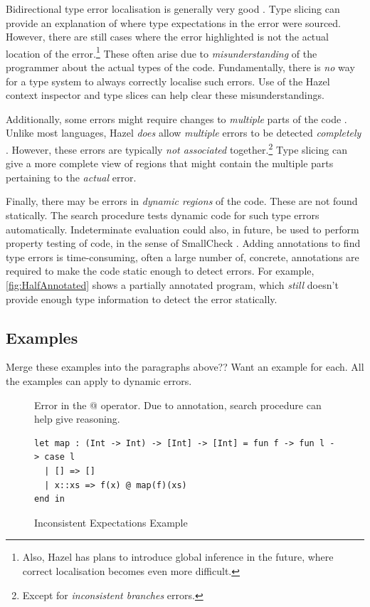 Bidirectional type error localisation is generally very good \cite{BidirectionalTyping}. Type slicing can provide an explanation of where type expectations in the error were sourced. However, there are still cases where the error highlighted is not the actual location of the error.\footnote{Also, Hazel has plans to introduce global inference in the future, where correct localisation becomes even more difficult.} These often arise due to \textit{misunderstanding} of the programmer about the actual types of the code. Fundamentally, there is \textit{no} way for a type system to always correctly localise such errors. Use of the Hazel context inspector and type slices can help clear these misunderstandings.

Additionally, some errors might require changes to \textit{multiple} parts of the code \cite{StudentTypeErrorFixes}. Unlike most languages, Hazel \textit{does} allow \textit{multiple} errors to be detected \textit{completely} \cite{HazelErrors}. However, these errors are typically \textit{not associated} together.\footnote{Except for \textit{inconsistent branches} errors.} Type slicing can give a more complete view of regions that might contain the multiple parts pertaining to the \textit{actual} error.

Finally, there may be errors in \textit{dynamic regions} of the code. These are not found statically. The search procedure tests dynamic code for such type errors automatically. Indeterminate evaluation could also, in future, be used to perform property testing of code, in the sense of SmallCheck \cite{SmallCheck}. Adding annotations to find type errors is time-consuming, often a large number of, concrete, annotations are required to make the code static enough to detect errors. For example, \cref{fig:HalfAnnotated} shows a partially annotated program, which \textit{still} doesn't provide enough type information to detect the error statically.

\subsection{Examples}
Merge these examples into the paragraphs above?? Want an example for each. All the examples can apply to dynamic errors.

\begin{figure}[h]
Error in the @ operator. Due to annotation, search procedure can help give reasoning.
\begin{lstlisting}
let map : (Int -> Int) -> [Int] -> [Int] = fun f -> fun l -> case l 
  | [] => []
  | x::xs => f(x) @ map(f)(xs)
end in  
\end{lstlisting}
\caption{Inconsistent Expectations Example}
\end{figure}

